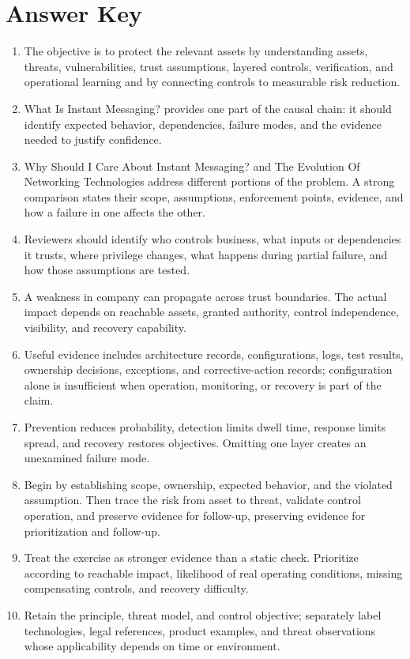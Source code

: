 \documentclass[11pt]{article}
\begin{document}
\section*{Answer Key}
\begin{enumerate}
\item The objective is to protect the relevant assets by understanding assets, threats, vulnerabilities, trust assumptions, layered controls, verification, and operational learning and by connecting controls to measurable risk reduction.
\item What Is Instant Messaging? provides one part of the causal chain: it should identify expected behavior, dependencies, failure modes, and the evidence needed to justify confidence.
\item Why Should I Care About Instant Messaging? and The Evolution Of Networking Technologies address different portions of the problem. A strong comparison states their scope, assumptions, enforcement points, evidence, and how a failure in one affects the other.
\item Reviewers should identify who controls business, what inputs or dependencies it trusts, where privilege changes, what happens during partial failure, and how those assumptions are tested.
\item A weakness in company can propagate across trust boundaries. The actual impact depends on reachable assets, granted authority, control independence, visibility, and recovery capability.
\item Useful evidence includes architecture records, configurations, logs, test results, ownership decisions, exceptions, and corrective-action records; configuration alone is insufficient when operation, monitoring, or recovery is part of the claim.
\item Prevention reduces probability, detection limits dwell time, response limits spread, and recovery restores objectives. Omitting one layer creates an unexamined failure mode.
\item Begin by establishing scope, ownership, expected behavior, and the violated assumption. Then trace the risk from asset to threat, validate control operation, and preserve evidence for follow-up, preserving evidence for prioritization and follow-up.
\item Treat the exercise as stronger evidence than a static check. Prioritize according to reachable impact, likelihood of real operating conditions, missing compensating controls, and recovery difficulty.
\item Retain the principle, threat model, and control objective; separately label technologies, legal references, product examples, and threat observations whose applicability depends on time or environment.
\end{enumerate}
\end{document}
